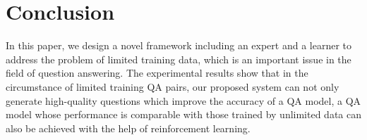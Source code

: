 \documentclass{article}
\begin{document}
\section{Conclusion}
\label{sec:conclusion}
In this paper, we design a novel framework including an expert and a learner to address the problem of limited training data, which is an important issue in the field of question answering. The experimental results show that in the circumstance of limited training QA pairs, our proposed system can not only generate high-quality questions which improve the accuracy of a QA model, a QA model whose performance is comparable with those trained by unlimited data can also be achieved with the help of reinforcement learning.




\end{document}
